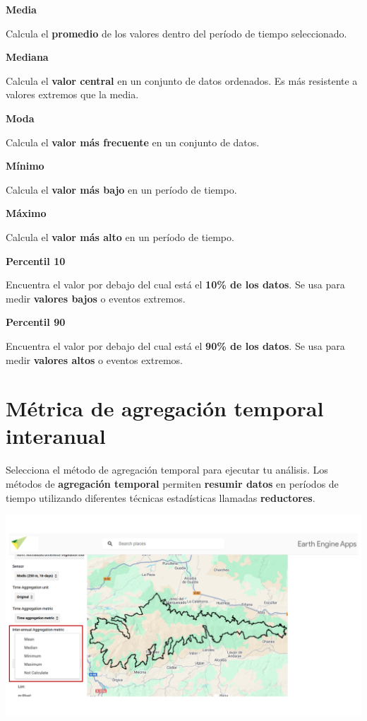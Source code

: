 \documentclass[
]{book}
\begin{document}
\textbf{Media}

Calcula el \textbf{promedio} de los valores dentro del período de tiempo seleccionado.

\textbf{Mediana}

Calcula el \textbf{valor central} en un conjunto de datos ordenados. Es más resistente a valores extremos que la media.

\textbf{Moda}

Calcula el \textbf{valor más frecuente} en un conjunto de datos.

\textbf{Mínimo}

Calcula el \textbf{valor más bajo} en un período de tiempo.

\textbf{Máximo}

Calcula el \textbf{valor más alto} en un período de tiempo.

\textbf{Percentil 10}

Encuentra el valor por debajo del cual está el \textbf{10\% de los datos}. Se usa para medir \textbf{valores bajos} o eventos extremos.

\textbf{Percentil 90}

Encuentra el valor por debajo del cual está el \textbf{90\% de los datos}. Se usa para medir \textbf{valores altos} o eventos extremos.

\chapter{Métrica de agregación temporal interanual}\label{agregacion-temporal-interanual}

Selecciona el método de agregación temporal para ejecutar tu análisis. Los métodos de \textbf{agregación temporal} permiten \textbf{resumir datos} en períodos de tiempo utilizando diferentes técnicas estadísticas llamadas \textbf{reductores}.

\includegraphics{assets/interannualAggregation.png}
\end{document}
